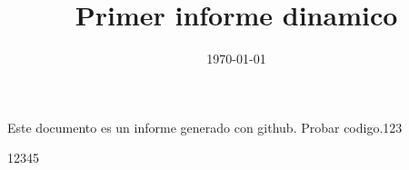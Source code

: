 \documentclass[12pt,a4paper]{book}
\title{Primer informe dinamico}
\author{}
\date{\today}
\begin{document}
\maketitle

Este documento es un informe generado con github.
Probar codigo.123

12345
\end{document}
